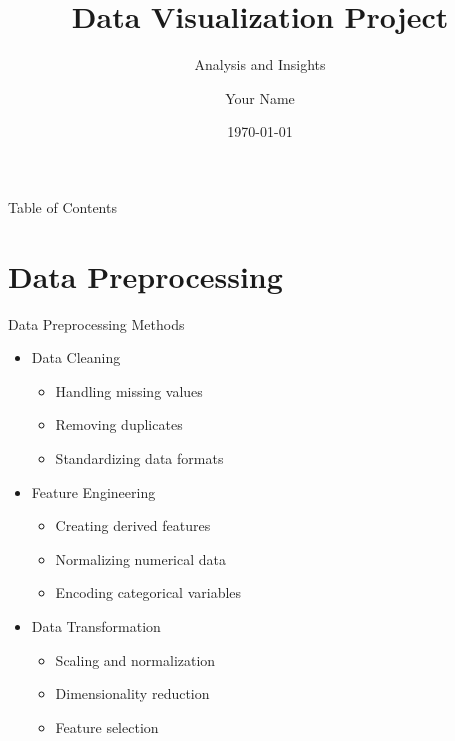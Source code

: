 \documentclass[aspectratio=169]{beamer}
\title{Data Visualization Project}
\subtitle{Analysis and Insights}
\author{Your Name}
\institute{Fanshawe College}
\date{\today}
\begin{document}
\begin{frame}
    \titlepage
\end{frame}

\begin{frame}{Table of Contents}
    \tableofcontents
\end{frame}

\section{Data Preprocessing}
\begin{frame}{Data Preprocessing Methods}
    \begin{itemize}
        \item Data Cleaning
        \begin{itemize}
            \item Handling missing values
            \item Removing duplicates
            \item Standardizing data formats
        \end{itemize}
        \item Feature Engineering
        \begin{itemize}
            \item Creating derived features
            \item Normalizing numerical data
            \item Encoding categorical variables
        \end{itemize}
        \item Data Transformation
        \begin{itemize}
            \item Scaling and normalization
            \item Dimensionality reduction
            \item Feature selection
        \end{itemize}
    \end{itemize}
\end{frame}
\end{document}

